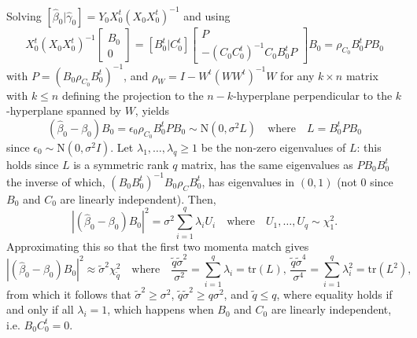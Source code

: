 \documentclass{bio}
\begin{document}
Solving $[\hat\beta_0|\hat\gamma_0]=Y_0X_0^t(X_0X_0^t)^{-1}$ and using
\begin{equation}
X_0^t(X_0X_0^t)^{-1} \begin{bmatrix}B_0\\0\end{bmatrix}
=[B_0^t|C_0^t] \begin{bmatrix}P\\-(C_0C_0^t)^{-1}C_0B_0^tP\end{bmatrix} B_0
=\rho_{C_0}B_0^tPB_0
\end{equation}
with $P=(B_0\rho_{C_0}B_0^t)^{-1}$, and $\rho_{W}=I-W^t(WW^t)^{-1}W$ for any $k\times n$ matrix with $k\le n$ defining the projection to the $n-k$-hyperplane perpendicular to the $k$-hyperplane spanned by $W$, yields
\begin{equation}
(\hat\beta_0-\beta_0)B_0=\epsilon_0\rho_{C_0}B_0^tPB_0\sim\text{N}(0,\sigma^2L)
\quad\text{where}\quad
L=B_0^tPB_0
\end{equation}
since $\epsilon_0\sim\text{N}(0,\sigma^2I)$. Let $\lambda_1,\ldots,\lambda_q\ge1$ be the non-zero eigenvalues of $L$: this holds since $L$ is a symmetric rank $q$ matrix,  has the same eigenvalues as $PB_0B_0^t$ the inverse of which, $(B_0B_0^t)^{-1}B_0\rho_{C}B_0^t$, has eigenvalues in $(0,1)$ (not 0 since $B_0$ and $C_0$ are linearly independent). Then,
\begin{equation}
|(\hat\beta_0-\beta_0)B_0|^2=\sigma^2\sum_{i=1}^q\lambda_iU_i
\quad\text{where}\quad
U_1,\ldots,U_q\sim\chi^2_1.
\end{equation}
Approximating this so that the first two momenta match gives
\begin{equation}
|(\hat\beta_0-\beta_0)B_0|^2\approx\tilde\sigma^2\chi^2_{\tilde q}
\quad\text{where}\quad
\frac{\tilde q\tilde\sigma^2}{\sigma^2}=\sum_{i=1}^q\lambda_i=\text{tr}(L),\,
\frac{\tilde q\tilde\sigma^4}{\sigma^4}=\sum_{i=1}^q\lambda_i^2=\text{tr}(L^2),
\end{equation}
from which it follows that $\tilde\sigma^2\ge\sigma^2$, $\tilde q\tilde\sigma^2\ge q\sigma^2$, and $\tilde q\le q$, where equality holds if and only if all $\lambda_i=1$, which happens when $B_0$ and $C_0$ are linearly independent, i.e. $B_0C_0^t=0$.
\end{document}
